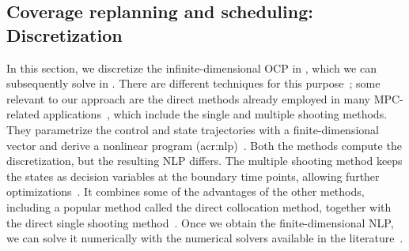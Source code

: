 \subsection{Coverage replanning and scheduling: Discretization}
\label{sec:opt-cont-gener}

In this section, we discretize the infinite-dimensional OCP in , which we can subsequently solve in .
There are different techniques for this purpose~\citep{grune2017nonlinear,rawlings2017model}; some relevant to our approach are the direct methods already employed in many MPC-related applications~\citep{rawlings2017model}, which include the single and multiple shooting methods. They parametrize the control and state trajectories with a finite-dimensional vector and derive a nonlinear program (\Gls{acr:nlp})~\citep{rawlings2017model}. Both the methods compute the discretization, but the resulting NLP differs. The multiple shooting method keeps the states as decision variables at the boundary time points, allowing further optimizations~\citep{rawlings2017model}. It combines some of the advantages of the other methods, including a popular method called the direct collocation method, together with the direct single shooting method~\citep{diehl2006fast,grune2017nonlinear}. Once we obtain the finite-dimensional NLP, we can solve it numerically with the numerical solvers available in the literature~\citep{diehl2006fast,grune2017nonlinear,nocedal2006numerical}. 

